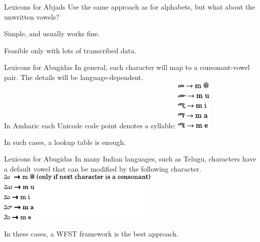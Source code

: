 \begin{frame}{Lexicons for Abjads}{}
Use the same approach as for alphabets, but what about the unwritten
vowels?
\vfill
\begin{description}
\item[Ignore them] Simple, and usually works fine.
\item[Infer them] Feasible only with lots of transcribed data.
\end{description}
\end{frame}

\begin{frame}{Lexicons for Abugidas}{}
In general, each character will map to a consonant-vowel pair.  The
details will be language-dependent. \\
In Amharic each Unicode code point denotes a syllable:
\vfill
\centering
\includegraphics[height=24mm]{figures/Amharic}
\vfill
\raggedright
In such cases, a lookup table is enough.
\end{frame}

\begin{frame}{Lexicons for Abugidas}{}
In many Indian languages, such as Telugu, characters have a
default vowel that can be modified by the following character.
\vfill
\centering
\includegraphics[height=24mm]{figures/Telugu}
\vfill
\raggedright
In these cases, a WFST framework is the best approach.
\vfill
{}
\end{frame}




